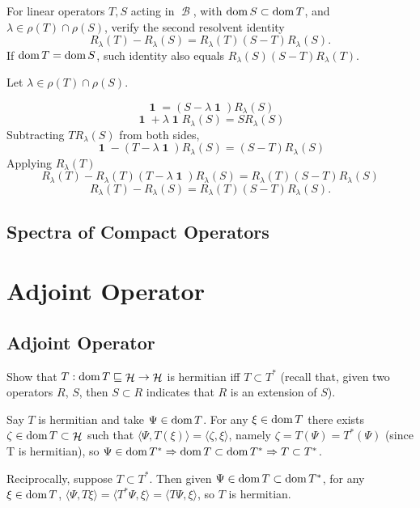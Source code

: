\documentclass{article}
\theoremstyle{exercisestyle}
\newenvironment{exercise}[1]
  {\renewcommand\theinnerex{#1}\innerex}
  {\endinnerex}
\DeclareMathOperator{\banach}{\mathcal{B}}
\DeclareMathOperator{\hilbert}{\mathcal{H}}
\DeclareMathOperator{\Id}{\textbf{1}}
\newcommand{\inner}[2]{\langle #1, #2 \rangle}
\begin{document}
\begin{exercise}{1.5.10}
    For linear operators $T, S$ acting in $\banach$, with $\operatorname{dom} S \subset \operatorname{dom} T$, and
    $\lambda \in \rho(T) \cap \rho(S)$, verify the second resolvent identity
    $$R_\lambda (T) - R_\lambda (S) = R_\lambda (T)(S - T)R_\lambda(S).$$
    If $\operatorname{dom} T = \operatorname{dom} S$, such identity also equals $R_\lambda (S)(S - T)R_\lambda (T)$.

    Let $\lambda \in \rho(T)\cap\rho(S)$.

    $$ \Id = (S - \lambda \Id) R_\lambda(S) $$
    $$ \Id + \lambda \Id  R_\lambda(S)  = S R_\lambda(S) $$
    Subtracting $T R_\lambda(S)$ from both sides,
    $$ \Id - (T-\lambda \Id)R_\lambda(S) = (S-T)R_\lambda(S) $$
    Applying $R_\lambda(T)$
    $$ R_\lambda(T) - R_\lambda(T) (T-\lambda \Id)R_\lambda(S) =  R_\lambda(T)(S-T)R_\lambda(S)  $$
    $$ R_\lambda(T) - R_\lambda(S) =  R_\lambda(T)(S-T)R_\lambda(S).$$

\end{exercise}

\subsection{Spectra of Compact Operators}

\section{Adjoint Operator}

\subsection{Adjoint Operator}

\begin{exercise}{2.1.3} Show that $T : \dom T \sqsubseteq \hilbert \to \hilbert$ is hermitian iff $T \subset T^{*}$ (recall
    that, given two operators $R$, $S$, then $S \subset R$ indicates that $R$ is an extension of $S$).

    Say $T$ is hermitian and take $\Psi \in \operatorname{dom} T$. For any $\xi \in \operatorname{dom} T$ there exists $\zeta \in \dom T \subset \hilbert$ such that $ \inner{\Psi}{T(\xi)} = \inner{\zeta}{\xi}$,
    namely $\zeta = T(\Psi) = T^* (\Psi)$ (since T is hermitian), so $\Psi \in \operatorname{dom} T^* \Rightarrow \operatorname{dom} T \subset \operatorname{dom} T^* \Rightarrow T \subset T^*$.

    Reciprocally, suppose $T \subset T^*$. Then given $\Psi \in \operatorname{dom} T \subset \operatorname{dom} T^*$, for any $\xi \in \operatorname{dom} T$, $\inner{\Psi}{T \xi} = \inner{T^* \Psi}{\xi} = \inner{T \Psi}{\xi}$,
    so $T$ is hermitian.

\end{exercise}
\end{document}
